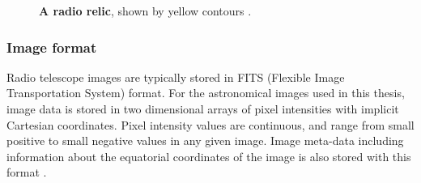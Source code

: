 \begin{figure}
\centering
{}
\caption[Radio relic]{\textbf{A radio relic}, shown by yellow contours \cite{johnston2003detection}.}
\label{fig:radio-relic}
\end{figure}



\subsubsection{Image format}

Radio telescope images are typically stored in FITS (Flexible Image Transportation System) format. For the astronomical images used in this thesis, image data is stored in two dimensional arrays of pixel intensities with implicit Cartesian coordinates. Pixel intensity values are continuous, and range from small positive to small negative values in any given image. Image meta-data including information about the equatorial coordinates of the image is also stored with this format \cite{wells1981fits}. 

